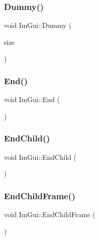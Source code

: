 \mbox{\label{namespace_im_gui_a8b0fb07113251301ff897b8578a53f34}} 
\subsubsection{\texorpdfstring{Dummy()}{Dummy()}}
{\footnotesize\ttfamily void Im\+Gui\+::\+Dummy (\begin{DoxyParamCaption}\item[{const \mbox{\hyperlink{struct_im_vec2}{Im\+Vec2}} \&}]{size }\end{DoxyParamCaption})}

\mbox{\label{namespace_im_gui_a5479d93794a004c67ceb6d13f37c8254}} 
\subsubsection{\texorpdfstring{End()}{End()}}
{\footnotesize\ttfamily void Im\+Gui\+::\+End (\begin{DoxyParamCaption}{ }\end{DoxyParamCaption})}

\mbox{\label{namespace_im_gui_af8de559a88c1442d6df8c1b04c86e997}} 
\subsubsection{\texorpdfstring{End\+Child()}{EndChild()}}
{\footnotesize\ttfamily void Im\+Gui\+::\+End\+Child (\begin{DoxyParamCaption}{ }\end{DoxyParamCaption})}

\mbox{\label{namespace_im_gui_ac4bd9024554b5074805bc0ce3076c514}} 
\subsubsection{\texorpdfstring{End\+Child\+Frame()}{EndChildFrame()}}
{\footnotesize\ttfamily void Im\+Gui\+::\+End\+Child\+Frame (\begin{DoxyParamCaption}{ }\end{DoxyParamCaption})}

